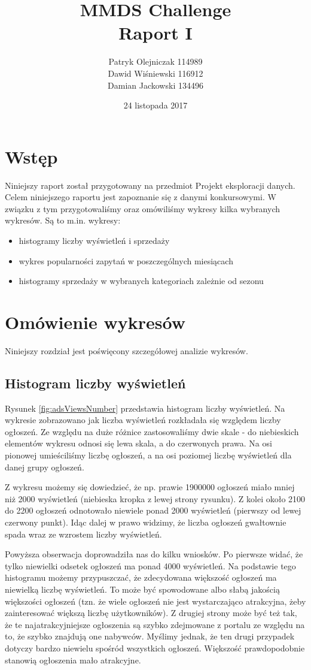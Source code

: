 \documentclass[a4paper,11pt]{article}
\author{Patryk Olejniczak 114989\\ Dawid Wiśniewski 116912 \\ Damian Jackowski 134496}
\title{MMDS Challenge\\
\large{{\bf Raport I}  }}
\date{24 listopada 2017}
\begin{document}
\maketitle 

\section{Wstęp}
Niniejszy raport został przygotowany na przedmiot Projekt eksploracji danych. Celem niniejszego raportu jest zapoznanie się z danymi konkursowymi. W związku z tym przygotowaliśmy oraz omówiliśmy wykresy kilka wybranych wykresów. Są to m.in. wykresy:
\begin{itemize}
\item histogramy liczby wyświetleń i sprzedaży
\item wykres popularności zapytań w poszczególnych miesiącach
\item histogramy sprzedaży w wybranych kategoriach zależnie od sezonu
\end{itemize}

\section{Omówienie wykresów}
Niniejszy rozdział jest poświęcony szczegółowej analizie wykresów.

\subsection{Histogram liczby wyświetleń}
Rysunek \ref{fig:adsViewsNumber} przedstawia histogram liczby wyświetleń. Na wykresie zobrazowano jak liczba wyświetleń rozkładała się względem liczby ogłoszeń. Ze względu na duże różnice zastosowaliśmy dwie skale - do niebieskich elementów wykresu odnosi się lewa skala, a do czerwonych prawa. Na osi pionowej umieściliśmy liczbę ogłoszeń, a na osi poziomej liczbę wyświetleń dla danej grupy ogłoszeń.

Z wykresu możemy się dowiedzieć, że np. prawie 1900000 ogłoszeń miało mniej niż 2000 wyświetleń (niebieska kropka z lewej strony rysunku). Z kolei około 2100 do 2200 ogłoszeń odnotowało niewiele ponad 2000 wyświetleń (pierwszy od lewej czerwony punkt). Idąc dalej w prawo widzimy, że liczba ogłoszeń gwałtownie spada wraz ze wzrostem liczby wyświetleń.

Powyższa obserwacja doprowadziła nas do kilku wniosków. Po pierwsze widać, że tylko niewielki odsetek ogłoszeń ma ponad 4000 wyświetleń. Na podstawie tego histogramu możemy przypuszczać, że zdecydowana większość ogłoszeń ma niewielką liczbę wyświetleń. To może być spowodowane albo słabą jakością większości ogłoszeń (tzn. że  wiele ogłoszeń nie jest wystarczająco atrakcyjna, żeby zainteresować większą liczbę użytkowników). Z drugiej strony może być też tak, że te najatrakcyjniejsze ogłoszenia są szybko zdejmowane z portalu ze względu na to, że szybko znajdują one nabywców. Myślimy jednak, że ten drugi przypadek dotyczy bardzo niewielu spośród wszystkich ogłoszeń. Większość prawdopodobnie stanowią ogłoszenia mało atrakcyjne.
\end{document}
